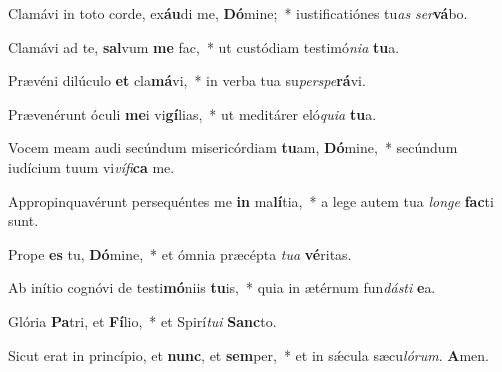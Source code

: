 \item Clamávi in toto corde, ex\textbf{áu}di me, \textbf{Dó}mine;~* iustificatiónes tu\textit{as} \textit{ser}\textbf{vá}bo.

\item Clamávi ad te, \textbf{sal}vum \textbf{me} fac,~* ut custódiam testimó\textit{nia} \textbf{tu}a.

\item Prævéni dilúculo \textbf{et} cla\textbf{má}vi,~* in verba tua su\textit{perspe}\textbf{rá}vi.

\item Prævenérunt óculi \textbf{me}i vi\textbf{gí}lias,~* ut meditárer eló\textit{quia} \textbf{tu}a.

\item Vocem meam audi secúndum misericórdiam \textbf{tu}am, \textbf{Dó}mine,~* secúndum iudícium tuum vi\textit{vífi}\textbf{ca} me.

\item Appropinquavérunt persequéntes me \textbf{in} ma\textbf{lí}tia,~* a lege autem tua \textit{longe} \textbf{fac}ti sunt.

\item Prope \textbf{es} tu, \textbf{Dó}mine,~* et ómnia præcépta \textit{tua} \textbf{vé}ritas.

\item Ab inítio cognóvi de testi\textbf{mó}niis \textbf{tu}is,~* quia in ætérnum fun\textit{dásti} \textbf{e}a.

\item Glória \textbf{Pa}tri, et \textbf{Fí}lio,~* et Spirí\textit{tui} \textbf{Sanc}to.

\item Sicut erat in princípio, et \textbf{nunc}, et \textbf{sem}per,~* et in sǽcula sæcu\textit{lórum}. \textbf{A}men.